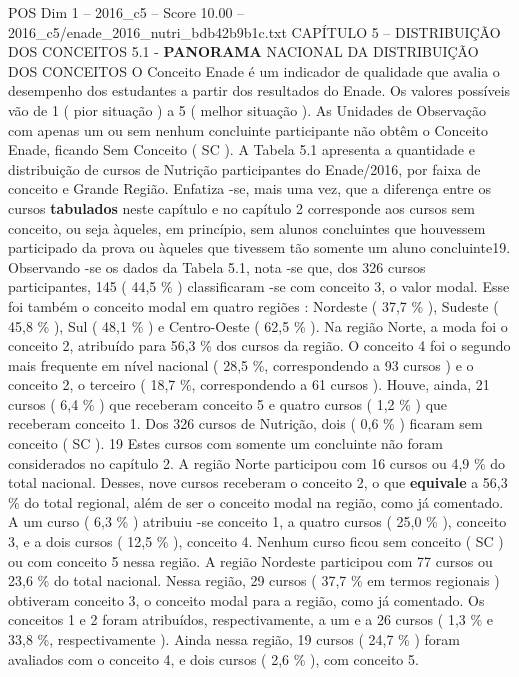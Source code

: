 \begin{textsample}{POS Dim 1 – 2016\_c5 – Score 10.00 – 2016\_c5/enade\_2016\_nutri\_bdb42b9b1c.txt}  \label{ex:f1_pos_080}
CAPÍTULO 5 – DISTRIBUIÇÃO DOS CONCEITOS 5.1 - \textbf{PANORAMA} NACIONAL DA DISTRIBUIÇÃO DOS CONCEITOS O Conceito Enade é um indicador de qualidade que avalia o desempenho dos estudantes a partir dos resultados do Enade.
Os valores possíveis vão de 1 ( pior situação ) a 5 ( melhor situação ).
As Unidades de Observação com apenas um ou sem nenhum concluinte participante não obtêm o Conceito Enade, ficando Sem Conceito ( SC ).
A Tabela 5.1 apresenta a quantidade e distribuição de cursos de Nutrição participantes do Enade/2016, por faixa de conceito e Grande Região.
Enfatiza -se, mais uma vez, que a diferença entre os cursos \textbf{tabulados} neste capítulo e no capítulo 2 corresponde aos cursos sem conceito, ou seja àqueles, em princípio, sem alunos concluintes que houvessem participado da prova ou àqueles que tivessem tão somente um aluno concluinte19.
Observando -se os dados da Tabela 5.1, nota -se que, dos 326 cursos participantes, 145 ( 44,5 \% ) classificaram -se com conceito 3, o valor modal.
Esse foi também o conceito modal em quatro regiões : Nordeste ( 37,7 \% ), Sudeste ( 45,8 \% ), Sul ( 48,1 \% ) e Centro-Oeste ( 62,5 \% ).
Na região Norte, a moda foi o conceito 2, atribuído para 56,3 \% dos cursos da região.
O conceito 4 foi o segundo mais frequente em nível nacional ( 28,5 \%, correspondendo a 93 cursos ) e o conceito 2, o terceiro ( 18,7 \%, correspondendo a 61 cursos ).
Houve, ainda, 21 cursos ( 6,4 \% ) que receberam conceito 5 e quatro cursos ( 1,2 \% ) que receberam conceito 1.
Dos 326 cursos de Nutrição, dois ( 0,6 \% ) ficaram sem conceito ( SC ). 19 Estes cursos com somente um concluinte não foram considerados no capítulo 2.
A região Norte participou com 16 cursos ou 4,9 \% do total nacional.
Desses, nove cursos receberam o conceito 2, o que \textbf{equivale} a 56,3 \% do total regional, além de ser o conceito modal na região, como já comentado.
A um curso ( 6,3 \% ) atribuiu -se conceito 1, a quatro cursos ( 25,0 \% ), conceito 3, e a dois cursos ( 12,5 \% ), conceito 4.
Nenhum curso ficou sem conceito ( SC ) ou com conceito 5 nessa região.
A região Nordeste participou com 77 cursos ou 23,6 \% do total nacional.
Nessa região, 29 cursos ( 37,7 \% em termos regionais ) obtiveram conceito 3, o conceito modal para a região, como já comentado.
Os conceitos 1 e 2 foram atribuídos, respectivamente, a um e a 26 cursos ( 1,3 \% e 33,8 \%, respectivamente ).
Ainda nessa região, 19 cursos ( 24,7 \% ) foram avaliados com o conceito 4, e dois cursos ( 2,6 \% ), com conceito 5.

\end{textsample}
